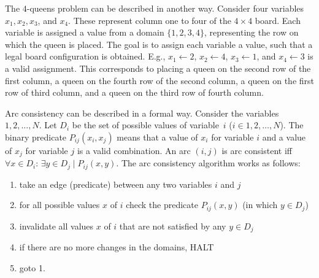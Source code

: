 \documentclass[a4paper,11pt]{article}
\begin{document}
The $4$-queens problem can be described in another way. Consider four
variables $x_1, x_2, x_3$, and $x_4$.
These represent column one to four of the $4 \times 4$
board. Each variable is assigned a value from a domain
$\{1, 2, 3, 4\}$, representing the row on which the queen is placed. 
The goal is to assign each variable a value, such that a legal board
configuration is obtained. E.g., $x_1 \leftarrow 2$, $x_2 \leftarrow 4$,
$x_3 \leftarrow 1$, and $x_4 \leftarrow 3$ is a valid assignment.
This corresponds to placing a queen on the second row of the first column,
a queen on the fourth row of the second column, a queen on the first row
of third column, and a queen on the third row of fourth column.

Arc consistency can be described in a formal way. Consider the
variables $1, 2, \ldots, N$. Let $D_i$ be the set of possible values of
variable~$i$ ($i \in 1, 2, \ldots, N$).
The binary predicate $P_{ij}(x_i, x_j)$ means that a value of $x_i$
for variable $i$ and a value of $x_j$ for variable $j$ is a valid
combination. 
\pagebreak
An arc $(i, j)$ is arc consistent iff
$\forall x \in D_i$: $\exists y \in D_j \mid P_{ij}(x, y)$.
The arc consistency algorithm works as follows:
\begin{enumerate}
\item take an edge (predicate) between any two variables $i$ and $j$
\item for all possible values $x$ of $i$ check the predicate $P_{ij}(x, y)$
(in which $y \in D_j$)
\item invalidate all values $x$ of $i$ that are not satisfied by
any $y \in D_j$
\item if there are no more changes in the domains, HALT
\item goto 1.
\end{enumerate}
\end{document}
